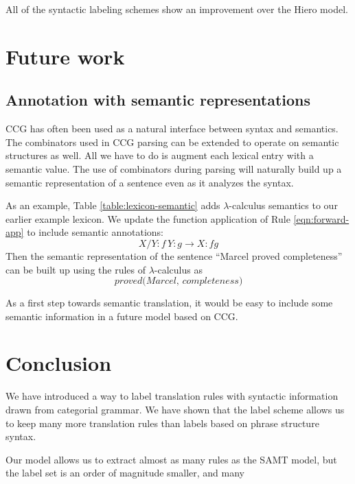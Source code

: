 \documentclass{article}
\begin{document}
All of the syntactic labeling schemes show an improvement over the Hiero model.

\section{Future work}

\subsection{Annotation with semantic representations}

CCG has often been used as a natural interface between syntax and semantics. The combinators used in CCG parsing can be extended to operate on semantic structures as well. All we have to do is augment each lexical entry with a semantic value. The use of combinators during parsing will naturally build up a semantic representation of a sentence even as it analyzes the syntax.

As an example, Table \ref{table:lexicon-semantic} adds $\lambda$-calculus semantics to our earlier example lexicon. We update the function application of Rule \ref{eqn:forward-app} to include semantic annotations:
\begin{equation}
X/Y:f \, Y:g \to X:fg
\end{equation}
Then the semantic representation of the sentence ``Marcel proved completeness'' can be built up using the rules of $\lambda$-calculus as
\begin{equation}
\textit{proved(Marcel, completeness)}
\end{equation}

As a first step towards semantic translation, it would be easy to include some semantic information in a future model based on CCG. 

\section{Conclusion}

We have introduced a way to label translation rules with syntactic information drawn from categorial grammar. We have shown that the label scheme allows us to keep many more translation rules than labels based on phrase structure syntax.

Our model allows us to extract almost as many rules as the SAMT model, but the label set is an order of magnitude smaller, and many




\end{document}
